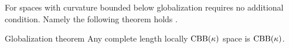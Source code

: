 For spaces with curvature bounded below globalization requires no additional condition.
Namely the following theorem holds \cite[see][and the references therein]{alexander-kapovitch-petrunin-2025}.

\begin{thm}{Globalization theorem}\label{thm:cbb-globalization}
Any complete length locally $\mathrm{CBB}(\kappa)$ space is $\mathrm{CBB}(\kappa)$.
\end{thm}




